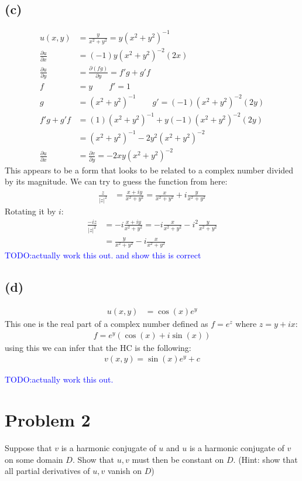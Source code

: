\documentclass{article}
\newcommand{\todo}[1]{\textcolor{blue}{TODO:#1}}
\let\oldcos\cos
\let\oldsin\sin
\renewcommand{\cos}[1]{\oldcos\left(#1\right)}
\renewcommand{\sin}[1]{\oldsin\left(#1\right)}
\newcommand{\parder}[2]{\frac{\partial#1}{\partial#2}}
\begin{document}
\subsection*{(c)}
\begin{align*}
  u(x,y) &= \frac{y}{x^2+y^2} = y(x^2+y^2)^{-1}\\
  \parder{u}{x} &= (-1)y(x^2+y^2)^{-2}(2x)\\
  \parder{u}{y} &= \parder{(fg)}{y} = f'g+g'f\\
  f &= y \quad \quad f' = 1\\
  g &= (x^2+y^2)^{-1} \quad \quad g' = (-1)(x^2+y^2)^{-2}(2y)\\
  f'g+g'f &= (1)(x^2+y^2)^{-1} + y(-1)(x^2+y^2)^{-2}(2y) \\
         &= (x^2+y^2)^{-1} - 2y^2(x^2+y^2)^{-2}\\
  \parder{u}{x} &= \parder{v}{y} = -2xy(x^2+y^2)^{-2}
\end{align*}
This appears to be a form that looks to be related to a complex number divided by its magnitude. We can try to guess the function from here:
\begin{align*}
  \frac{z}{|z|^2} &= \frac{x+iy}{x^2+y^2} = \frac{x}{x^2+y^2} + i\frac{y}{x^2+y^2}
\end{align*}
Rotating it by $i$:
\begin{align*}
  \frac{-iz}{|z|^2} &= -i\frac{x+iy}{x^2+y^2} = -i\frac{x}{x^2+y^2} -i^2\frac{y}{x^2+y^2}\\
  &= \frac{y}{x^2+y^2}-i\frac{x}{x^2+y^2}
\end{align*}
\todo{actually work this out. and show this is correct}
\subsection*{(d)}
\begin{align*}
  u(x,y) &= \cos{x}e^y
\end{align*}
This one is the real part of a complex number defined as $f = e^z$ where $z = y+ix$:
\begin{align*}
  f = e^y(\cos{x}+i\sin{x})
\end{align*}
using this we can infer that the HC is the following:
\begin{align*}
  v(x,y) = \sin{x}e^y + c
\end{align*}


\todo{actually work this out.}
\newpage
\section*{Problem 2}
Suppose that $v$ is a harmonic conjugate of $u$ and $u$ is a harmonic conjugate of $v$ on some domain $D$. Show that $u,v$ must then be constant on $D$. (Hint: show that all partial derivatives of $u,v$ vanish on $D$)
\end{document}
